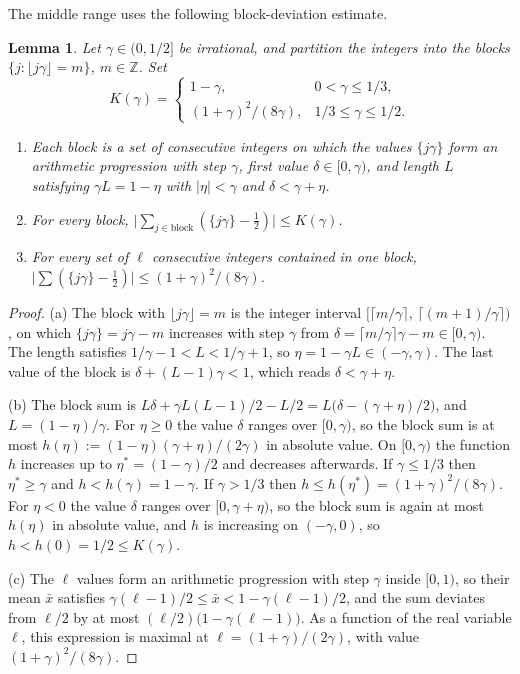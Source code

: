 \documentclass{birkjour}
\newtheorem{lemma}[theorem]{Lemma}
\theoremstyle{definition}
\theoremstyle{remark}
\newcommand{\fl}[1]{\lfloor #1 \rfloor}
\newcommand{\frc}[1]{\{ #1 \}}
\begin{document}
The middle range uses the following block-deviation estimate.

\begin{lemma}\label{lem:blockdev}
Let $\gamma\in(0,1/2]$ be irrational, and partition the
integers into the blocks $\{j:\fl{j\gamma}=m\}$,
$m\in\mathbb{Z}$. Set
\[
  K(\gamma)=
  \begin{cases}
    1-\gamma, & 0<\gamma\le 1/3,\\[2pt]
    (1+\gamma)^{2}/(8\gamma), & 1/3\le\gamma\le 1/2.
  \end{cases}
\]
\begin{enumerate}
\item[\textup{(a)}] Each block is a set of consecutive
integers on which the values $\frc{j\gamma}$ form an
arithmetic progression with step $\gamma$, first value
$\delta\in[0,\gamma)$, and length $L$ satisfying
$\gamma L=1-\eta$ with $|\eta|<\gamma$ and
$\delta<\gamma+\eta$.
\item[\textup{(b)}] For every block,
$\bigl|\sum_{j\in\mathrm{block}}
(\frc{j\gamma}-\tfrac12)\bigr|\le K(\gamma)$.
\item[\textup{(c)}] For every set of $\ell$ consecutive
integers contained in one block,
$\bigl|\sum(\frc{j\gamma}-\tfrac12)\bigr|
\le(1+\gamma)^{2}/(8\gamma)$.
\end{enumerate}
\end{lemma}

\begin{proof}
(a) The block with $\fl{j\gamma}=m$ is the integer
interval $[\lceil m/\gamma\rceil,\,\allowbreak
\lceil(m{+}1)/\gamma\rceil)$, on which
$\frc{j\gamma}=j\gamma-m$ increases with step $\gamma$
from $\delta=\lceil m/\gamma\rceil\gamma-m\in[0,\gamma)$.
The length satisfies $1/\gamma-1<L<1/\gamma+1$, so
$\eta=1-\gamma L\in(-\gamma,\gamma)$. The last value of
the block is $\delta+(L-1)\gamma<1$, which reads
$\delta<\gamma+\eta$.

(b) The block sum is
$L\delta+\gamma L(L-1)/2-L/2
=L\bigl(\delta-(\gamma+\eta)/2\bigr)$,
and $L=(1-\eta)/\gamma$. For $\eta\ge 0$ the value
$\delta$ ranges over $[0,\gamma)$, so the block sum is at
most $h(\eta):=(1-\eta)(\gamma+\eta)/(2\gamma)$
in absolute value. On $[0,\gamma)$ the function $h$
increases up to $\eta^{*}=(1-\gamma)/2$ and decreases
afterwards. If $\gamma\le 1/3$ then $\eta^{*}\ge\gamma$
and $h<h(\gamma)=1-\gamma$. If
$\gamma>1/3$ then
$h\le h(\eta^{*})=(1+\gamma)^{2}/(8\gamma)$.
For $\eta<0$ the value $\delta$ ranges over
$[0,\gamma+\eta)$, so the block sum is again at most
$h(\eta)$ in absolute value, and $h$ is
increasing on $(-\gamma,0)$, so
$h<h(0)=1/2\le K(\gamma)$.

(c) The $\ell$ values form an arithmetic progression with
step $\gamma$ inside $[0,1)$, so their mean $\bar{x}$
satisfies
$\gamma(\ell-1)/2\le\bar{x}<1-\gamma(\ell-1)/2$, and
the sum deviates from $\ell/2$ by at most
$(\ell/2)\bigl(1-\gamma(\ell-1)\bigr)$. As a function
of the real variable $\ell$, this expression is maximal at
$\ell=(1+\gamma)/(2\gamma)$, with value
$(1+\gamma)^{2}/(8\gamma)$.
\end{proof}
\end{document}
